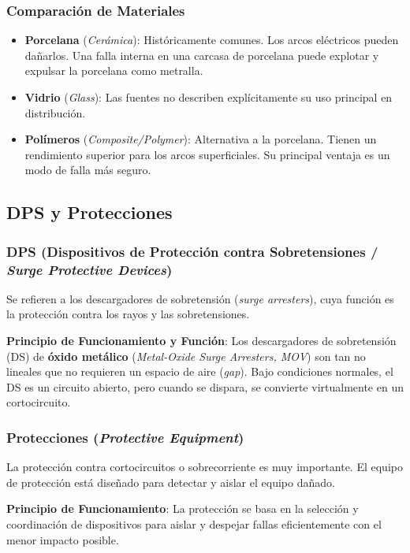 \subsubsection*{Comparación de Materiales}
\begin{itemize}
    \item \textbf{Porcelana} (\textit{Cerámica}): Históricamente comunes. Los arcos eléctricos pueden dañarlos. Una falla interna en una carcasa de porcelana puede explotar y expulsar la porcelana como metralla.
    \item \textbf{Vidrio} (\textit{Glass}): Las fuentes no describen explícitamente su uso principal en distribución.
    \item \textbf{Polímeros} (\textit{Composite/Polymer}): Alternativa a la porcelana. Tienen un rendimiento superior para los arcos superficiales. Su principal ventaja es un modo de falla más seguro.
\end{itemize}

\subsection*{DPS y Protecciones}

\subsubsection*{DPS (Dispositivos de Protección contra Sobretensiones / \textit{Surge Protective Devices})}
Se refieren a los descargadores de sobretensión (\textit{surge arresters}), cuya función es la protección contra los rayos y las sobretensiones.

\textbf{Principio de Funcionamiento y Función}: Los descargadores de sobretensión (DS) de \textbf{óxido metálico} (\textit{Metal-Oxide Surge Arresters, MOV}) son tan no lineales que no requieren un espacio de aire (\textit{gap}). Bajo condiciones normales, el DS es un circuito abierto, pero cuando se dispara, se convierte virtualmente en un cortocircuito.

\subsubsection*{Protecciones (\textit{Protective Equipment})}
La protección contra cortocircuitos o sobrecorriente es muy importante. El equipo de protección está diseñado para detectar y aislar el equipo dañado.

\textbf{Principio de Funcionamiento}: La protección se basa en la selección y coordinación de dispositivos para aislar y despejar fallas eficientemente con el menor impacto posible.

